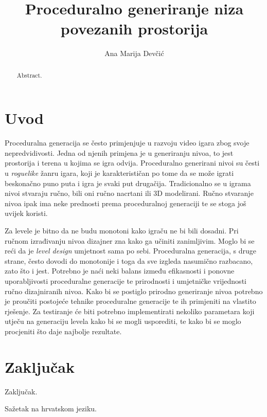 \documentclass[times, utf8, zavrsni]{fer}
\begin{document}

\title{Proceduralno generiranje niza povezanih prostorija}

\author{Ana Marija Devčić}

\maketitle

\izvornik

\zahvala{}

\tableofcontents

\chapter{Uvod}
    Proceduralna generacija se često primjenjuje u razvoju video igara zbog svoje nepredvidivosti. Jedna od njenih primjena je u generiranju nivoa, to jest prostorija i terena u kojima se igra odvija. Proceduralno generirani nivoi su česti u \textit{roguelike} žanru igara, koji je karakterističan po tome da se može igrati beskonačno puno puta i igra je svaki put drugačija. Tradicionalno se u igrama nivoi stvaraju ručno, bili oni ručno nacrtani ili 3D modelirani. Ručno stvaranje nivoa ipak ima neke prednosti prema proceduralnoj generaciji te se stoga još uvijek koristi.

    Za levele je bitno da ne budu monotoni kako igraču ne bi bili dosadni. Pri ručnom izrađivanju nivoa dizajner zna kako ga učiniti zanimljivim. Moglo bi se reći da je \textit{level design} umjetnost sama po sebi. Proceduralna generacija, s druge strane, često dovodi do monotonije i toga da sve izgleda nasumično razbacano, zato što i jest. Potrebno je naći neki balans između efikasnosti i ponovne uporabljivosti proceduralne generacije te prirodnosti i umjetničke vrijednosti ručno dizajniranih nivoa. Kako bi se postiglo prirodno generiranje nivoa potrebno je proučiti postojeće tehnike proceduralne generacije te ih primjeniti na vlastito rješenje. Za testiranje će biti potrebno implementirati nekoliko parametara koji utječu na generaciju levela kako bi se mogli usporediti, te kako bi se moglo procjeniti što daje najbolje rezultate.



\chapter{Zaključak}
Zaključak.




\begin{sazetak}
Sažetak na hrvatskom jeziku.

\end{sazetak}

\begin{abstract}
Abstract.

\end{abstract}
\end{document}
